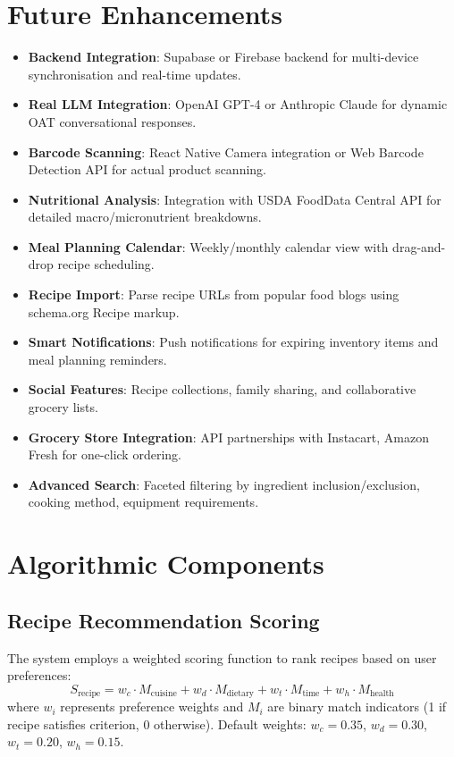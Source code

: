\documentclass[12pt]{article}
\begin{document}
\section{Future Enhancements}
\begin{itemize}
  \item \textbf{Backend Integration}: Supabase or Firebase backend for multi-device synchronisation and real-time updates.
  \item \textbf{Real LLM Integration}: OpenAI GPT-4 or Anthropic Claude for dynamic OAT conversational responses.
  \item \textbf{Barcode Scanning}: React Native Camera integration or Web Barcode Detection API for actual product scanning.
  \item \textbf{Nutritional Analysis}: Integration with USDA FoodData Central API for detailed macro/micronutrient breakdowns.
  \item \textbf{Meal Planning Calendar}: Weekly/monthly calendar view with drag-and-drop recipe scheduling.
  \item \textbf{Recipe Import}: Parse recipe URLs from popular food blogs using schema.org Recipe markup.
  \item \textbf{Smart Notifications}: Push notifications for expiring inventory items and meal planning reminders.
  \item \textbf{Social Features}: Recipe collections, family sharing, and collaborative grocery lists.
  \item \textbf{Grocery Store Integration}: API partnerships with Instacart, Amazon Fresh for one-click ordering.
  \item \textbf{Advanced Search}: Faceted filtering by ingredient inclusion/exclusion, cooking method, equipment requirements.
\end{itemize}

\section{Algorithmic Components}
\subsection{Recipe Recommendation Scoring}
The system employs a weighted scoring function to rank recipes based on user preferences:
\begin{equation}
  S_{\text{recipe}} = w_c \cdot M_{\text{cuisine}} + w_d \cdot M_{\text{dietary}} + w_t \cdot M_{\text{time}} + w_h \cdot M_{\text{health}}
\end{equation}
where $w_i$ represents preference weights and $M_i$ are binary match indicators (1 if recipe satisfies criterion, 0 otherwise). Default weights: $w_c = 0.35$, $w_d = 0.30$, $w_t = 0.20$, $w_h = 0.15$.
\end{document}
